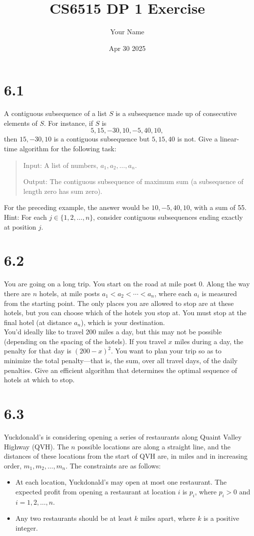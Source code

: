 \documentclass{article}
\title{CS6515 DP 1 Exercise}
\author{ Your Name }
\date{Apr 30 2025}
\begin{document}
\maketitle

\section{6.1}
A contiguous subsequence of a list \( S \) is a subsequence made up of consecutive elements of \( S \). For instance, if \( S \) is
\[ 5, 15, -30, 10, -5, 40, 10, \]
then \( 15, -30, 10 \) is a contiguous subsequence but \( 5, 15, 40 \) is not. Give a linear-time algorithm for the following task:
\begin{quote}
Input: A list of numbers, \( a_1, a_2, \ldots, a_n \).

Output: The contiguous subsequence of maximum sum (a subsequence of length zero has sum zero).
\end{quote}
For the preceding example, the answer would be \( 10, -5, 40, 10 \), with a sum of 55.\\
Hint: For each \( j \in \{1, 2, \ldots, n\} \), consider contiguous subsequences ending exactly at position \( j \).

\section{6.2}
You are going on a long trip. You start on the road at mile post 0. Along the way there are \( n \) hotels, at mile posts \( a_1 < a_2 < \cdots < a_n \), where each \( a_i \) is measured from the starting point. The only places you are allowed to stop are at these hotels, but you can choose which of the hotels you stop at. You must stop at the final hotel (at distance \( a_n \)), which is your destination.\\
You’d ideally like to travel 200 miles a day, but this may not be possible (depending on the spacing of the hotels). If you travel \( x \) miles during a day, the penalty for that day is \( (200 - x)^2 \). You want to plan your trip so as to minimize the total penalty—that is, the sum, over all travel days, of the daily penalties.
Give an efficient algorithm that determines the optimal sequence of hotels at which to stop.

\section{6.3}
Yuckdonald’s is considering opening a series of restaurants along Quaint Valley Highway (QVH). The \( n \) possible locations are along a straight line, and the distances of these locations from the start of QVH are, in miles and in increasing order, \( m_1, m_2, \ldots, m_n \). The constraints are as follows:
\begin{itemize}
    \item At each location, Yuckdonald’s may open at most one restaurant. The expected profit from opening a restaurant at location \( i \) is \( p_i \), where \( p_i > 0 \) and \( i = 1, 2, \ldots, n \).
    \item Any two restaurants should be at least \( k \) miles apart, where \( k \) is a positive integer.
\end{itemize}
\end{document}
